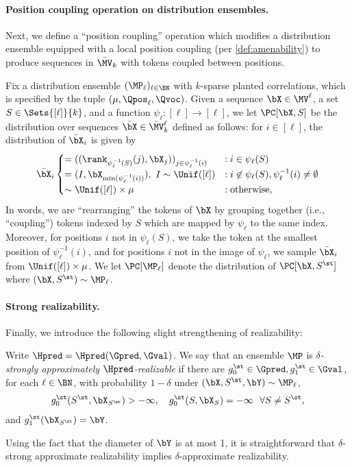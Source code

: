 \documentclass{article}
\begin{document}
\paragraph{Position coupling operation on distribution ensembles.} 
Next, we define a ``position coupling'' operation which modifies a distribution ensemble equipped with a local position coupling (per \cref{def:amenability}) to produce sequences in $\bar \MV_k$ with tokens coupled between positions. 

Fix a distribution ensemble $(\MP_\ell)_{\ell \in \BN}$ with $k$-sparse planted correlations, which is specified by the tuple $(\mu, \Qpos_\ell, \Qvoc)$.  %
Given a sequence $\bX \in \MV^\ell$, a set $S \in \Sets{[\ell]}{k}$, and a function $\psi_\ell :[\ell] \to [\ell]$, we let $\PC[\bX, S]$ be the distribution over sequences $\bar\bX \in \bar \MV_k^\ell$ defined as follows: for $i \in [\ell]$, the distribution of $\bar \bX_i$ is given by %
\begin{align}
  \bar \bX_i \begin{cases}
     = ((\rank_{\psi_\ell^{-1}(S)}(j),\bX_j))_{j \in \psi_\ell^{-1}(i)} &: i \in \psi_\ell(S) \\
    = (I, \bX_{\min(\psi_\ell^{-1}(i))}), \  I \sim \Unif([\ell]) &: i \not \in \psi_\ell(S), \psi_\ell^{-1}(i) \neq \emptyset \\
   \sim \Unif([\ell]) \times \mu &: \mbox{otherwise},
  \end{cases}\label{eq:pc-sequence}
\end{align}
In words, we are ``rearranging'' the tokens of $\bX$ by grouping together (i.e., ``coupling'') tokens indexed by $S$ which are mapped by $\psi_\ell$ to the same index.  %
Moreover, for positions $i$ not in $\psi_\ell(S)$, we take the token at the smallest position of $\psi_\ell^{-1}(i)$, and for positions $i$ not in the image of $\psi_\ell$, we sample $\bar \bX_i$ from $\Unif([\ell]) \times \mu$. 
We let $\PC[\MP_\ell]$ denote the distribution of $\PC[\bX, S^\st]$ where $(\bX, S^\st) \sim \MP_\ell$.


\paragraph{Strong realizability.} Finally, we introduce the following slight strengthening of realizability:
\begin{assumption}
  \label{def:strong-realizability}
Write $\Hpred = \Hpred(\Gpred, \Gval)$. We say that an ensemble $\MP$ is \emph{$\delta$-strongly approximately $\Hpred$-realizable} if there are $g_0^\st \in \Gpred, g_1^\st \in \Gval$, for each $\ell \in \BN$, with probability $1-\delta$ under $(\bX, S^\st, \bY) \sim \MP_\ell$,
\begin{align}
  g_0^\st(S^\st, \bX_{S^\st}) > -\infty, \quad g_0^\st(S, \bX_S) = -\infty \ \  \forall S \neq S^\st,\nonumber
\end{align}
and $g_1^\st(\bX_{S^\st}) = \bY$.
\end{assumption}
Using the fact that the diameter of $\bY$ is at most 1, it is straightforward that $\delta$-strong approximate realizability implies $\delta$-approximate realizability. 
\end{document}
